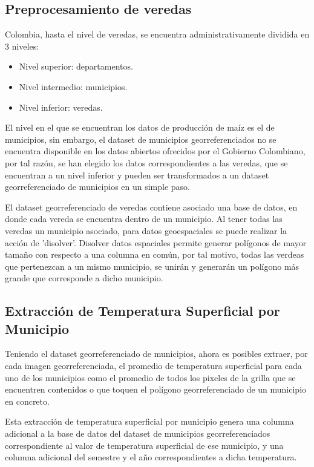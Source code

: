 \documentclass[12pt, spanish]{article}
\begin{document}
\subsection{Preprocesamiento de veredas}

Colombia, hasta el nivel de veredas, se encuentra administrativamente dividida en 3 niveles:

\begin{itemize}
    \item Nivel superior: departamentos.
    \item Nivel intermedio: municipios.
    \item Nivel inferior: veredas.
\end{itemize}

El nivel en el que se encuentran los datos de producción de maíz es el de municipios, sin embargo, el dataset de municipios georreferenciados no se encuentra disponible en los datos abiertos ofrecidos por el Gobierno Colombiano, por tal razón, se han elegido los datos correspondientes a las veredas, que se encuentran a un nivel inferior y pueden ser transformados a un dataset georreferenciado de municipios en un simple paso.

El dataset georreferenciado de veredas contiene asociado una base de datos, en donde cada vereda se encuentra dentro de un municipio. Al tener todas las veredas un municipio asociado, para datos geoespaciales se puede realizar la acción de 'disolver'. Disolver datos espaciales permite generar polígonos de mayor tamaño con respecto a una columna en común, por tal motivo, todas las verdeas que pertenezcan a un mismo municipio, se unirán y generarán un polígono más grande que corresponde a dicho municipio.

\subsection{Extracción de Temperatura Superficial por Municipio}

Teniendo el dataset georreferenciado de municipios, ahora es posibles extraer, por cada imagen georreferenciada, el promedio de temperatura superficial para cada uno de los municipios como el promedio de todos los pixeles de la grilla que se encuentren contenidos o que toquen el polígono georreferenciado de un municipio en concreto.

Esta extracción de temperatura superficial por municipio genera una columna adicional a la base de datos del dataset de municipios georreferenciados correspondiente al valor de temperatura superficial de ese municipio, y una columna adicional del semestre y el año correspondientes a dicha temperatura.
\end{document}
